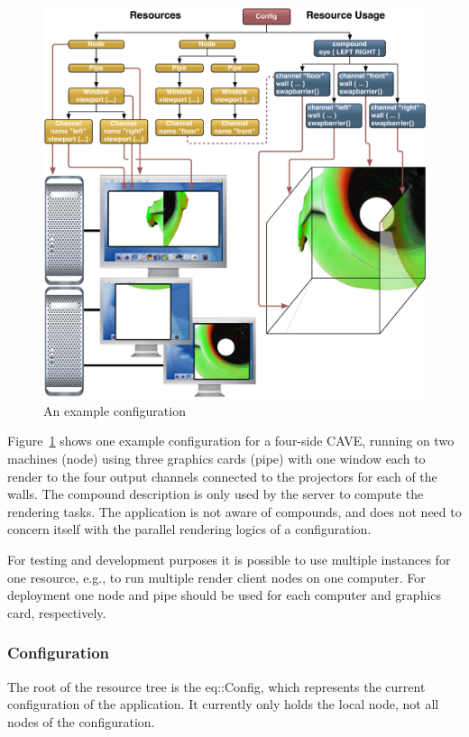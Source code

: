 \documentclass[10pt,a4]{scrartcl}
\newcommand{\fig}[1]{Figure~\ref{#1}}
\begin{document}
\begin{figure}[ht!]\center
  \includegraphics[width=.9\textwidth]{images/cave.pdf}
  {\caption{\small\label{fConfig}An example configuration}}
\end{figure}

\fig{fConfig} shows one example configuration for a four-side
CAVE\texttrademark, running on two machines (node) using three graphics
cards (pipe) with one window each to render to the four output channels
connected to the projectors for each of the walls. The compound
description is only used by the server to compute the rendering
tasks. The application is not aware of compounds, and does not need to
concern itself with the parallel rendering logics of a configuration.

For testing and development purposes it is possible to use multiple
instances for one resource, e.g., to run multiple render client nodes on
one computer. For deployment one node and pipe should be used for each
computer and graphics card, respectively.

\subsubsection{Configuration}

The root of the resource tree is the \textsf{eq::Config}, which
represents the current configuration of the application. It currently
only holds the local node, not all nodes of the configuration.
\end{document}
